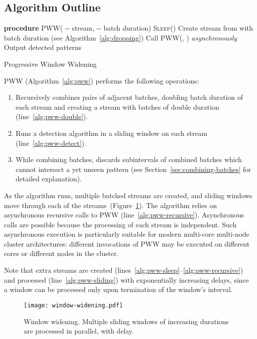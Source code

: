 \documentclass[runningheads,a4paper]{llncs}
\begin{document}
\subsection{Algorithm Outline}

\begin{algorithm}
    \begin{algorithmic}[1]
    \STATE \textbf{procedure} \textsc{PWW}( -{}- stream,  -{}- batch duration)
    \STATE \textsc{Sleep}() \label{alg:pww-sleep}
    \STATE Create stream  from  with batch duration
      (see Algorithm~\ref{alg:dropping}) \label{alg:pww-double}
    \STATE Call \textsc{PWW}(, ) \textit{asynchronously} \label{alg:pww-recursive}
     \label{alg:pww-sliding}
         \label{alg:pww-detect}
            \STATE Output detected patterns 
        \ENDIF
    \ENDFOR
\end{algorithmic}
\caption{Progressive Window Widening}
\label{alg:pww}
\end{algorithm}

PWW (Algorithm~\ref{alg:pww}) performs the following operations:
\begin{enumerate}
	\item Recursively combines pairs of adjacent batches, doubling batch
        duration of each stream and creating a stream with
        batches of double duration (line~\ref{alg:pww-double}).
	\item Runs a detection algorithm in a sliding window on each
        stream (line~\ref{alg:pww-detect}).
    \item While combining batches, discards subintervals of
        combined batches which cannot intersect a yet unseen pattern 
        (see Section~\ref{sec:combining-batches} for detailed
        explanation).
\end{enumerate}
As the algorithm runs, multiple batched streams are created, and
sliding windows move through each of the
streams~(Figure~\ref{fig:window-widening}). The algorithm relies
on asynchronous recursive calls to \textsc{PWW}
(line~\ref{alg:pww-recursive}). Asynchronous
calls are possible because the processing of each stream is
independent. Such asynchronous execution is particularly
suitable for modern multi-core multi-node cluster architectures:
different invocations of \textsc{PWW} may be executed on
different cores or different nodes in the cluster. 

Note that extra streams are created (lines~\ref{alg:pww-sleep}--\ref{alg:pww-recursive}) and processed
(line~\ref{alg:pww-sliding}) with exponentially increasing delays,
since a window can be processed only upon termination of the window's interval.
\begin{figure}
	\centering
	\texttt{[image: window-widening.pdf]}
	\caption{Window widening. Multiple sliding windows of increasing
    durations are processed in parallel, with delay.}
    \label{fig:window-widening}
\end{figure}
\end{document}
